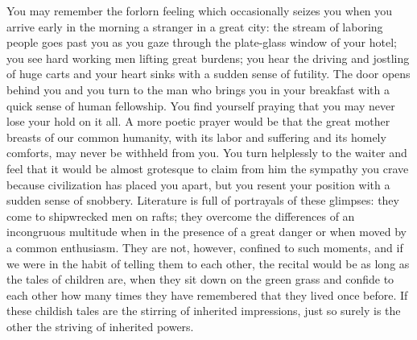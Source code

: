 You may remember the forlorn feeling which occasionally seizes you
when you arrive early in the morning a stranger in a great city: the
stream of laboring people goes past you as you gaze through the
plate-glass window of your hotel; you see hard working men lifting
great burdens; you hear the driving and jostling of huge carts and
your heart sinks with a sudden sense of futility. The door opens
behind you and you turn to the man who brings you in your breakfast
with a quick sense of human fellowship. You find yourself praying that
you may never lose your hold on it all. A more poetic prayer would be
that the great mother breasts of our common humanity, with its labor
and suffering and its homely comforts, may never be withheld from you.
You turn helplessly to the waiter and feel that it would be almost
grotesque to claim from him the sympathy you crave because
civilization has placed you apart, but you resent your position with a
sudden sense of snobbery. Literature is full of portrayals of these
glimpses: they come to shipwrecked men on rafts; they overcome the
differences of an incongruous multitude when in the presence of a
great danger or  when moved by a common enthusiasm. They are
not, however, confined to such moments, and if we were in the habit of
telling them to each other, the recital would be as long as the tales
of children are, when they sit down on the green grass and confide to
each other how many times they have remembered that they lived once
before. If these childish tales are the stirring of inherited
impressions, just so surely is the other the striving of inherited
powers.

